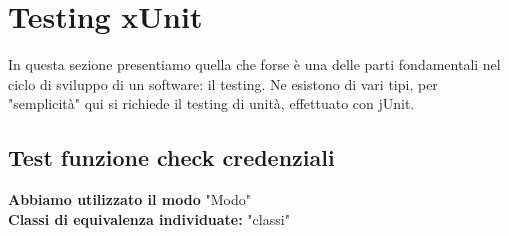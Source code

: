 \section{Testing xUnit}

 

\begin{flushleft}
    In questa sezione presentiamo quella che forse è una delle parti fondamentali nel ciclo di sviluppo di un software: il testing.
    Ne esistono di vari tipi, per "semplicità" qui si richiede il testing di unità, effettuato con jUnit.
\end{flushleft}



\subsection{Test funzione check credenziali}
\begin{flushleft}
    \textbf{Abbiamo utilizzato il modo} "Modo"\\
    \textbf{Classi di equivalenza individuate:} "classi"
\end{flushleft}
\vspace{0.2cm}

